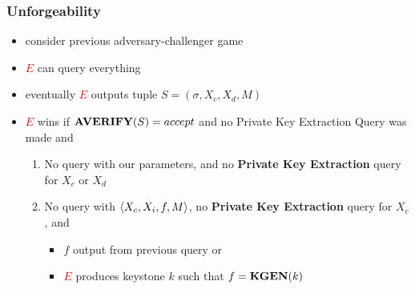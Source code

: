 \begin{frame}
	\frametitle{Unforgeability}

	\begin{itemize}[<+->]
		\item consider previous adversary-challenger game
		\item \textcolor{Red}{$E$} can query everything 
		\item eventually \textcolor{Red}{$E$} outputs tuple $S = (\sigma, X_c, X_d, M)$ 
		\item \textcolor{Red}{$E$} wins if $\textbf{AVERIFY}(S) = accept$ and no Private Key Extraction Query was made and
      \begin{enumerate}
        \item No \asign query with our parameters, and no \textbf{Private Key Extraction} query for $X_c$ or $X_d$ 
	     	\item No \asign query with $\langle X_c, X_i, f, M \rangle$, no \textbf{Private Key Extraction} query for $X_c$, and
		    	\begin{itemize}
            \item $f$ output from previous \keygen query or
            \item \textcolor{Red}{$E$} produces keystone $k$ such that $f = \textbf{KGEN}(k)$
          \end{itemize}
      \end{enumerate}
  \end{itemize}
\end{frame}